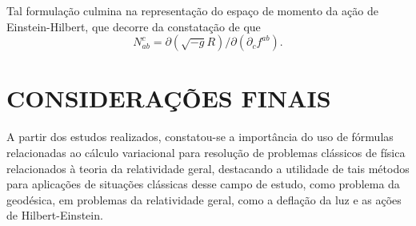 \documentclass[a4,11pt]{report}
\begin{document}
Tal formulação culmina na representação do espaço de momento da ação de Einstein-Hilbert, que decorre da constatação de que
\[
N^c_{ab} = \partial (\sqrt{-g}R)/\partial(\partial_c f^{ab}).
\]
\section{CONSIDERAÇÕES FINAIS}

A partir dos estudos realizados, constatou-se a importância do uso de fórmulas relacionadas ao cálculo variacional para resolução de problemas clássicos de física relacionados à teoria da relatividade geral, destacando a utilidade de tais métodos para aplicações de situações clássicas desse campo de estudo, como problema da geodésica, em problemas da relatividade geral, como a deflação da luz e as ações de Hilbert-Einstein.
\end{document}
